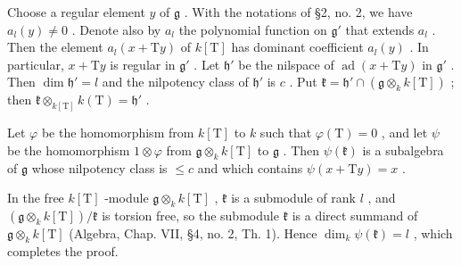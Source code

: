 Choose a regular element \(y\) of \(\mathfrak{g}\) . With the notations of §2, no. 2, we have \(a_l(y) \neq 0\) . Denote also by \(a_l\) the polynomial function on \(\mathfrak{g}'\) that extends \(a_l\) . Then the element \(a_l(x + \mathrm{T}y)\) of \(k[\mathrm{T}]\) has dominant coefficient \(a_l(y)\) . In particular, \(x + \mathrm{T}y\) is regular in \(\mathfrak{g}'\) . Let \(\mathfrak{h}'\) be the nilspace of \(\operatorname{ad}(x + \mathrm{T}y)\) in \(\mathfrak{g}'\) . Then \(\dim \mathfrak{h}' = l\) and the nilpotency class of \(\mathfrak{h}'\) is \(c\) . Put \(\mathfrak{k} = \mathfrak{h}' \cap (\mathfrak{g} \otimes_k k[\mathrm{T}])\) ; then \(\mathfrak{k} \otimes_{k[\mathrm{T}]} k(\mathrm{T}) = \mathfrak{h}'\) .

Let \(\varphi\) be the homomorphism from \(k[\mathrm{T}]\) to \(k\) such that \(\varphi (\mathrm{T}) = 0\) , and let \(\psi\) be the homomorphism \(1\otimes \varphi\) from \(\mathfrak{g}\otimes_k k[\mathrm{T}]\) to \(\mathfrak{g}\) . Then \(\psi (\mathfrak{k})\) is a subalgebra of \(\mathfrak{g}\) whose nilpotency class is \(\leq c\) and which contains \(\psi (x + \mathrm{T}y) = x\) .

In the free \(k[\mathrm{T}]\) -module \(\mathfrak{g} \otimes_k k[\mathrm{T}]\) , \(\mathfrak{k}\) is a submodule of rank \(l\) , and \((\mathfrak{g} \otimes_k k[\mathrm{T}]) / \mathfrak{k}\) is torsion free, so the submodule \(\mathfrak{k}\) is a direct summand of \(\mathfrak{g} \otimes_k k[\mathrm{T}]\) (Algebra, Chap. VII, §4, no. 2, Th. 1). Hence \(\dim_k \psi(\mathfrak{k}) = l\) , which completes the proof.